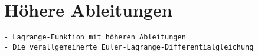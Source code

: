 %
%
%
\section{Höhere Ableitungen
\label{buch:variation:section:hoehereableitungen}}

\begin{verbatim}
- Lagrange-Funktion mit höheren Ableitungen
- Die verallgemeinerte Euler-Lagrange-Differentialgleichung
\end{verbatim}
